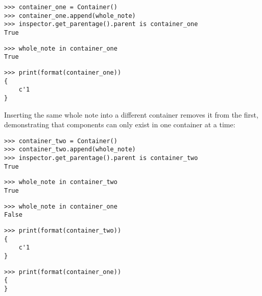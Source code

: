 \begin{abjadbookoutput}
\begin{singlespacing}
\vspace{-0.5\baselineskip}
\begin{lstlisting}
>>> container_one = Container()
>>> container_one.append(whole_note)
>>> inspector.get_parentage().parent is container_one
True
\end{lstlisting}
\begin{lstlisting}
>>> whole_note in container_one
True
\end{lstlisting}
\begin{lstlisting}
>>> print(format(container_one))
{
    c'1
}
\end{lstlisting}
\end{singlespacing}
\end{abjadbookoutput}

\noindent Inserting the same whole note into a different container removes it
from the first, demonstrating that components can only exist in one container
at a time:

\begin{comment}
<abjad>
container_two = Container()
container_two.append(whole_note)
inspector.get_parentage().parent is container_two
whole_note in container_two
whole_note in container_one
print(format(container_two))
print(format(container_one))
</abjad>
\end{comment}

\begin{abjadbookoutput}
\begin{singlespacing}
\vspace{-0.5\baselineskip}
\begin{lstlisting}
>>> container_two = Container()
>>> container_two.append(whole_note)
>>> inspector.get_parentage().parent is container_two
True
\end{lstlisting}
\begin{lstlisting}
>>> whole_note in container_two
True
\end{lstlisting}
\begin{lstlisting}
>>> whole_note in container_one
False
\end{lstlisting}
\begin{lstlisting}
>>> print(format(container_two))
{
    c'1
}
\end{lstlisting}
\begin{lstlisting}
>>> print(format(container_one))
{
}
\end{lstlisting}
\end{singlespacing}
\end{abjadbookoutput}


